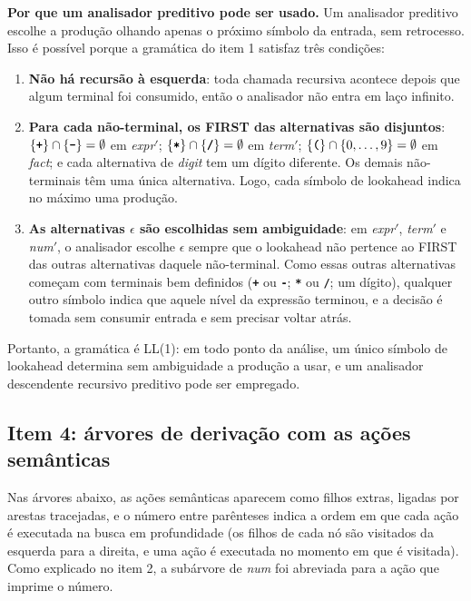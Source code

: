 \documentclass[11pt,a4paper]{article}
\newcommand{\nt}[1]{\textit{#1}}                 %
\newcommand{\tm}[1]{\texttt{\textbf{#1}}}        %
\newcommand{\vazio}{\ensuremath{\epsilon}}
\newcommand{\linha}{\ensuremath{'}}
\begin{document}
	\textbf{Por que um analisador preditivo pode ser usado.} Um analisador preditivo escolhe a produção olhando apenas o próximo símbolo da entrada, sem retrocesso. Isso é possível porque a gramática do item 1 satisfaz três condições:
	
	\begin{enumerate}[nosep]
		\item \textbf{Não há recursão à esquerda}: toda chamada recursiva acontece depois que algum terminal foi consumido, então o analisador não entra em laço infinito.
		\item \textbf{Para cada não-terminal, os FIRST das alternativas são disjuntos}: $\{\tm{+}\} \cap \{\tm{-}\} = \emptyset$ em \nt{expr}\linha; $\{\tm{*}\} \cap \{\tm{/}\} = \emptyset$ em \nt{term}\linha; $\{\tm{(}\} \cap \{0,\dots,9\} = \emptyset$ em \nt{fact}; e cada alternativa de \nt{digit} tem um dígito diferente. Os demais não-terminais têm uma única alternativa. Logo, cada símbolo de lookahead indica no máximo uma produção.
		\item \textbf{As alternativas \vazio{} são escolhidas sem ambiguidade}: em \nt{expr}\linha, \nt{term}\linha{} e \nt{num}\linha, o analisador escolhe \vazio{} sempre que o lookahead não pertence ao FIRST das outras alternativas daquele não-terminal. Como essas outras alternativas começam com terminais bem definidos (\tm{+} ou \tm{-}; \tm{*} ou \tm{/}; um dígito), qualquer outro símbolo indica que aquele nível da expressão terminou, e a decisão é tomada sem consumir entrada e sem precisar voltar atrás.
	\end{enumerate}
	
	Portanto, a gramática é LL(1): em todo ponto da análise, um único símbolo de lookahead determina sem ambiguidade a produção a usar, e um analisador descendente recursivo preditivo pode ser empregado.
	
	\subsection{Item 4: árvores de derivação com as ações semânticas}
	
	Nas árvores abaixo, as ações semânticas aparecem como filhos extras, ligadas por arestas tracejadas, e o número entre parênteses indica a ordem em que cada ação é executada na busca em profundidade (os filhos de cada nó são visitados da esquerda para a direita, e uma ação é executada no momento em que é visitada). Como explicado no item 2, a subárvore de \nt{num} foi abreviada para a ação que imprime o número.
	
\end{document}
